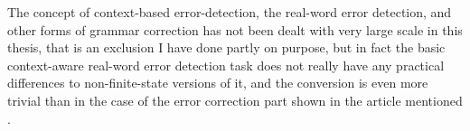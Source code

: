 \documentclass[officiallayout,draft]{unihelcompling}
\begin{document}
The concept of context-based error-detection, the real-word error detection,
and other forms of grammar correction has not been dealt with very large scale
in this thesis, that is an exclusion I have done partly on purpose, but in
fact the basic context-aware real-word error detection task does not really
have any practical differences to non-finite-state versions of it, and the
conversion is even more trivial than in the case of the error correction part
shown in the article mentioned \cite{pirinen2012improving}.



\end{document}

